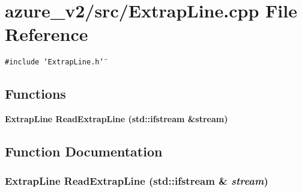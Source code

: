 \section{azure\_\-v2/src/Extrap\-Line.cpp File Reference}
\label{ExtrapLine_8cpp}
{\tt \#include \char`\"{}Extrap\-Line.h\char`\"{}}\par
\subsection*{Functions}
\begin{CompactItemize}
\item 
\bf{Extrap\-Line} \bf{Read\-Extrap\-Line} (std::ifstream \&stream)
\end{CompactItemize}


\subsection{Function Documentation}
\subsubsection{\setlength{\rightskip}{0pt plus 5cm}\bf{Extrap\-Line} Read\-Extrap\-Line (std::ifstream \& {\em stream})}\label{ExtrapLine_8cpp_d15248dd25a655afc3de2dd832a91be1}


